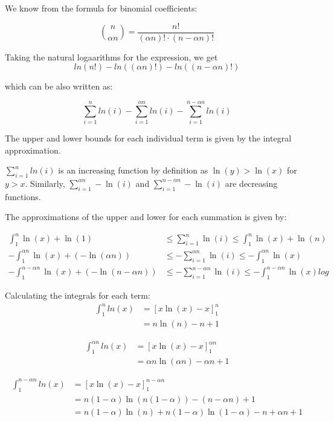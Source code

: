 \documentclass[12pt]{article}
\begin{document}
\begin{solution}
\bbni

We know from the formula for binomial coefficients: 

\[
\binom{n}{\alpha n}  = \frac{n!}{(\alpha n)! \cdot(n-\alpha n)!}
\]

Taking the natural logaarithms for the expression, we get \[  ln(n!) - ln((\alpha n)!)  - ln((n- \alpha n )!)\]

which can be also written as: 

\[ \sum_{i=1}^{n} ln(i)  - \sum_{i=1}^{\alpha n}ln(i) - \sum_{i=1}^{n - \alpha n } ln(i)
\]

The upper and lower bounds for each individual term is given by the integral approximation. 

$\sum_{i=1}^{n}ln(i)$ is an increasing function by definition as $\ln(y) > \ln(x)$ for $y>x$. Similarly, $\sum_{i =1}^{\alpha n} -\ln(i)$ and $\sum_{i=1}^{n - \alpha n} - \ln(i)$ are decreasing functions. 

The approximations  of the upper and lower for each summation is given by: 

\begin{align*}
    \int_{1}^{n}\ln(x) + \ln(1) &\leq  \sum_{i=1}^{n}\ln(i) \leq \int_{1}^{n} \ln(x) + \ln(n) \\
    -\int_{1}^{\alpha n}\ln(x) + (-\ln(\alpha n)) &\leq  -\sum_{i=1}^{\alpha n}\ln(i) \leq -\int_{1}^{\alpha n} \ln(x) \\
    -\int_{1}^{n -\alpha n}\ln(x) + (-\ln(n - \alpha n)) &\leq  -\sum_{i=1}^{n - \alpha n }\ln(i) \leq -\int_{1}^{n - \alpha n} \ln(x)
log\end{align*}

Calculating the integrals for each term: 
\begin{align*}
\int_{1}^{n} ln(x) &= \left[x\ln(x)- x \right]_1^n\\
& = n\ln(n) - n +1
\end{align*}

\begin{align*}
\int_{1}^{\alpha n} ln(x) &= \left[x\ln(x)- x \right]_{1}^{\alpha n}\\
& = \alpha n\ln(\alpha n) - \alpha n +1
\end{align*}

\begin{align*}
\int_{1}^{n - \alpha n} ln(x) &= \left[x\ln(x)- x \right]_{1}^{n - \alpha n}\\
& = n(1-\alpha)\ln(n(1-\alpha)) - (n -\alpha n) +1 \\
& =n(1- \alpha )\ln(n) + n(1-\alpha )\ln(1- \alpha)  - n + \alpha n + 1
\end{align*}


\end{solution}
\end{document}
